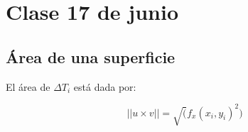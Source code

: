 \section{Clase 17 de junio}

\subsection{Área de una superficie}

El área de $\Delta T_i$ está dada por:

\begin{equation*}
  ||u \times v|| = \sqrt(f_x(x_i,y_i)^2)
\end{equation*}

